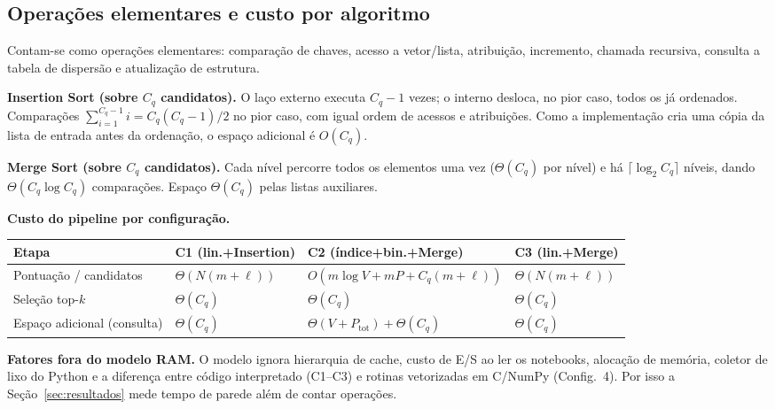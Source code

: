 \documentclass[11pt,a4paper]{article}
\begin{document}
\subsection{Operações elementares e custo por algoritmo}
Contam-se como operações elementares: comparação de chaves, acesso a vetor/lista, atribuição,
incremento, chamada recursiva, consulta a tabela de dispersão e atualização de estrutura.

\textbf{Insertion Sort (sobre $C_q$ candidatos).} O laço externo executa $C_q-1$ vezes; o interno
desloca, no pior caso, todos os já ordenados. Comparações
$\sum_{i=1}^{C_q-1} i = C_q(C_q-1)/2$ no pior caso, com igual ordem de acessos e atribuições. Como a implementação cria uma cópia da lista de entrada antes da ordenação, o espaço adicional é $O(C_q)$.

\textbf{Merge Sort (sobre $C_q$ candidatos).} Cada nível percorre todos os elementos uma vez
($\Theta(C_q)$ por nível) e há $\lceil\log_2 C_q\rceil$ níveis, dando $\Theta(C_q\log C_q)$
comparações. Espaço $\Theta(C_q)$ pelas listas auxiliares.

\textbf{Custo do pipeline por configuração.}
\begin{table}[h]
\small\centering
\begin{tabularx}{\textwidth}{@{}p{3.4cm}YYY@{}}
\toprule
\textbf{Etapa} & \textbf{C1 (lin.+Insertion)} & \textbf{C2 (índice+bin.+Merge)} & \textbf{C3 (lin.+Merge)}\\
\midrule
Pontuação / candidatos
& $\Theta(N(m+\ell))$
& $O(m\log V + mP + C_q(m+\ell))$
& $\Theta(N(m+\ell))$\\
Seleção top-$k$ & $\Theta(C_q)$ & $\Theta(C_q)$ & $\Theta(C_q)$\\
Espaço adicional (consulta) & $\Theta(C_q)$ & $\Theta(V+P_{\text{tot}})+\Theta(C_q)$ & $\Theta(C_q)$\\
\bottomrule
\end{tabularx}
\end{table}
\begin{nota}
\textbf{Fatores fora do modelo RAM.} O modelo ignora hierarquia de cache, custo de E/S ao ler os
notebooks, alocação de memória, coletor de lixo do Python e a diferença entre código interpretado
(C1--C3) e rotinas vetorizadas em C/NumPy (Config.~4). Por isso a Seção~\ref{sec:resultados} mede
tempo de parede além de contar operações. 
\end{nota}

\end{document}
